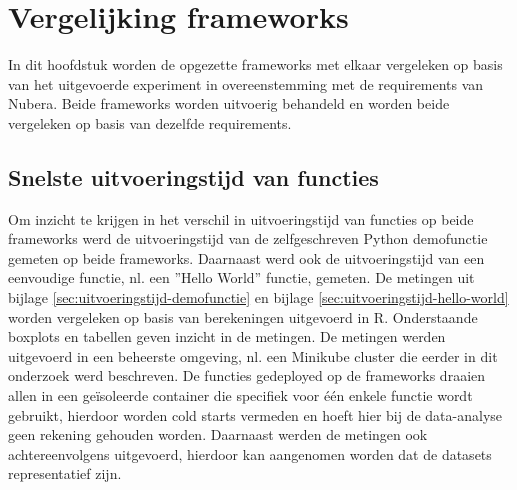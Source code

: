 \chapter{Vergelijking frameworks}
\label{ch:vergelijking-frameworks}
In dit hoofdstuk worden de opgezette frameworks met elkaar vergeleken op basis van het uitgevoerde experiment in overeenstemming met de requirements van Nubera. Beide frameworks worden uitvoerig behandeld en worden beide vergeleken op basis van dezelfde requirements.

\section{Snelste uitvoeringstijd van functies}
Om inzicht te krijgen in het verschil in uitvoeringstijd van functies op beide frameworks werd de uitvoeringstijd van de zelfgeschreven Python demofunctie gemeten op beide frameworks. Daarnaast werd ook de uitvoeringstijd van een eenvoudige functie, nl. een ''Hello World'' functie, gemeten. De metingen uit bijlage \ref{sec:uitvoeringstijd-demofunctie} en bijlage \ref{sec:uitvoeringstijd-hello-world} worden vergeleken op basis van  berekeningen uitgevoerd in R. Onderstaande boxplots en tabellen geven inzicht in de metingen. De metingen werden uitgevoerd in een beheerste omgeving, nl. een Minikube cluster die eerder in dit onderzoek werd beschreven. De functies gedeployed op de frameworks draaien allen in een geïsoleerde container die specifiek voor één enkele functie wordt gebruikt, hierdoor worden cold starts vermeden en hoeft hier bij de data-analyse geen rekening gehouden worden. Daarnaast werden de metingen ook achtereenvolgens uitgevoerd, hierdoor kan aangenomen worden dat de datasets representatief zijn.

\newpage
